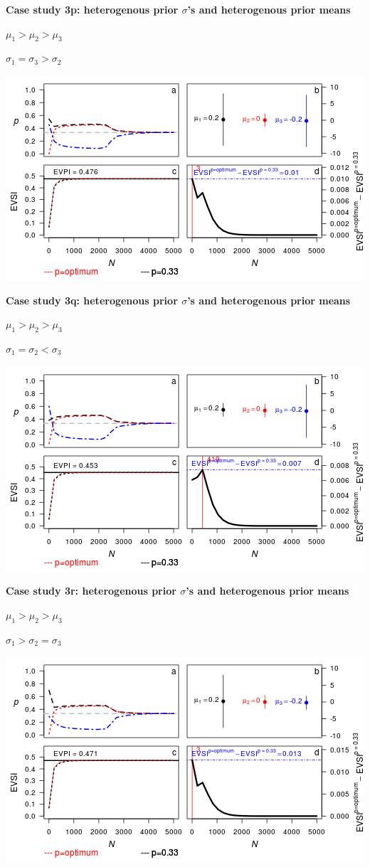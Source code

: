 \documentclass[]{article}
\theoremstyle{definition}
\theoremstyle{definition}
\theoremstyle{remark}
\begin{document}
\textbf{Case study 3p: heterogenous prior \(\sigma\)'s and heterogenous
prior means}

\(\mu_1 > \mu_2 > \mu_3\)

\(\sigma_1 = \sigma_3 > \sigma_2\)

\includegraphics{figure/x10n1__1_1__1c-1.png} \clearpage  

\textbf{Case study 3q: heterogenous prior \(\sigma\)'s and heterogenous
prior means}

\(\mu_1 > \mu_2 > \mu_3\)

\(\sigma_1 = \sigma_2 < \sigma_3\)

\includegraphics{figure/x10n1_1_1__1c-1.png} \clearpage

\textbf{Case study 3r: heterogenous prior \(\sigma\)'s and heterogenous
prior means}

\(\mu_1 > \mu_2 > \mu_3\)

\(\sigma_1 > \sigma_2 = \sigma_3\)

\includegraphics{figure/x10n1__1_1_1c-1.png} \clearpage
\end{document}
